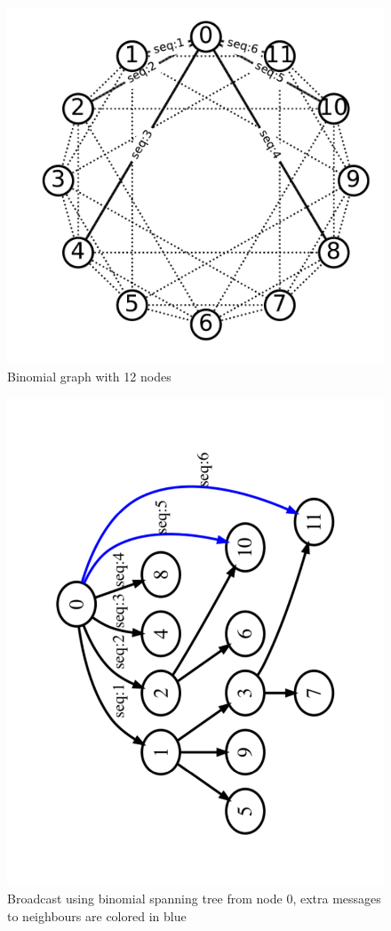 \documentclass[sigconf]{acmart}
\begin{document}
\begin{figure}
  \centering
  \includegraphics[width=\linewidth]{BMG_seq.pdf}
  \caption{Binomial graph with 12 nodes}
\end{figure}
\begin{figure}
  \centering
  \includegraphics[trim=0.2cm 0.4cm 0.2cm 0.2cm, width=0.9\linewidth,angle=270]{reoder_span.pdf}
  \caption{Broadcast using binomial spanning tree from node 0, extra messages to neighbours are colored in blue }
\end{figure}
\end{document}
